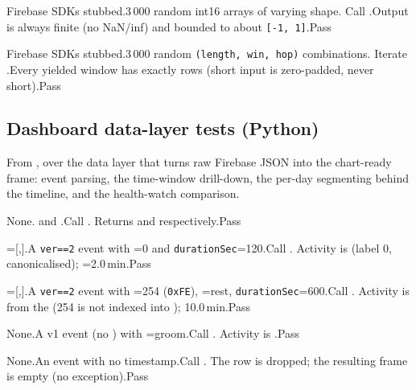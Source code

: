 {Firebase SDKs stubbed.}{3\,000 random int16 arrays of varying shape.}
{Call .}{Output is always finite (no NaN/inf) and bounded to about \texttt{[-1, 1]}.}{Pass}

{Firebase SDKs stubbed.}{3\,000 random \texttt{(length, win, hop)} combinations.}
{Iterate .}{Every yielded window has exactly  rows (short input is zero-padded, never short).}{Pass}

\subsection{Dashboard data-layer tests (Python)}

From , over the data layer that turns raw Firebase JSON into the chart-ready
frame: event parsing, the time-window drill-down, the per-day segmenting behind the timeline, and the
health-watch comparison.

{None.}{ and .}{Call .}
{Returns  and  respectively.}{Pass}

{=[,].}{A \texttt{ver==2} event with =0 and \texttt{durationSec}=120.}{Call .}
{Activity is  (label 0, canonicalised); =2.0\,min.}{Pass}

{=[,].}{A \texttt{ver==2} event with =254 (\texttt{0xFE}), =rest, \texttt{durationSec}=600.}{Call .}
{Activity is  from the  (254 is not indexed into ); 10.0\,min.}{Pass}

{None.}{A v1 event (no ) with =groom.}{Call .}
{Activity is .}{Pass}

{None.}{An event with no  timestamp.}{Call .}
{The row is dropped; the resulting frame is empty (no exception).}{Pass}

